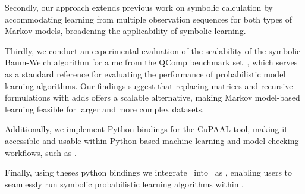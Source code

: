 Secondly, our approach extends previous work on symbolic calculation by accommodating learning from multiple observation sequences for both types of Markov models, broadening the applicability of symbolic learning.

Thirdly, we conduct an experimental evaluation of the scalability of the symbolic Baum-Welch algorithm for a \gls{mc} from the QComp benchmark set~\cite{HartmannsKPQR19}, which serves as a standard reference for evaluating the performance of probabilistic model learning algorithms.
Our findings suggest that replacing matrices and recursive formulations with \glspl{add} offers a scalable alternative, making Markov model-based learning feasible for larger and more complex datasets.

Additionally, we implement Python bindings for the CuPAAL tool, making it accessible and usable within Python-based machine learning and model-checking workflows, such as \Jajapy.

Finally, using theses python bindings we integrate \Cupaal\ into \Jajapy\ as \JajapyTwo, enabling users to seamlessly run symbolic probabilistic learning algorithms within \Jajapy.
